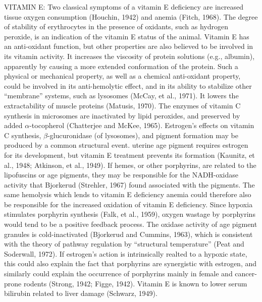 VITAMIN E: Two classical symptoms of a vitamin E deficiency are increased tissue oxygen consumption (Houchin, 1942) and anemia (Fitch, 1968). The degree of stability of erythrocytes in the presence of oxidants, such as hydrogen peroxide, is an indication of the vitamin E status of the animal. Vitamin E has an anti-oxidant function, but other properties are also believed to be involved in its vitamin activity. It increases the viscosity of protein solutions (e.g., albumin), apparently by causing a more extended conformation of the protein. Such a physical or mechanical property, as well as a chemical anti-oxidant property, could be involved in its anti-hemolytic effect, and in its ability to stabilize other ``membrane'' systems, such as lysosomes (McCay, et al., 1971). It lowers the extractability of muscle proteins (Matusis, 1970). The enzymes of vitamin C synthesis in microsomes are inactivated by lipid peroxides, and preserved by added $\alpha$-tocopherol (Chatterjee and McKee, 1965). Estrogen's effects on vitamin C synthesis, $\beta$-glucuronidase (of lysosomes), and pigment formation may be produced by a common structural event. uterine age pigment requires estrogen for its development, but vitamin E treatment prevents its formation (Kaunitz, et al., 1948; Atkinson, et al., 1949). If hemes, or other porphyrins, are related to the lipofuscins or age pigments, they may be responsible for the NADH-oxidase activity that Bjorkerud (Strehler, 1967) found associated with the pigments. The same hemolysis which lends to vitamin E deficiency anemia could therefore also be responsible for the increased oxidation of vitamin E deficiency. Since hypoxia stimulates porphyrin synthesis (Falk, et al., 1959), oxygen wastage by porphyrins would tend to be a positive feedback process. The oxidase activity of age pigment granules is cold-inactivated (Bjorkerud and Cummins, 1963), which is consistent with the theory of pathway regulation by ``structural temperature'' (Peat and Soderwall, 1972). If estrogen's action is intrinsically realted to a hypoxic state, this could also explain the fact that porphyrins are synergistic with estrogen, and similarly could explain the occurrence of porphyrins mainly in female and cancer-prone rodents (Strong, 1942; Figge, 1942). Vitamin E is known to lower serum bilirubin related to liver damage (Schwarz, 1949).

